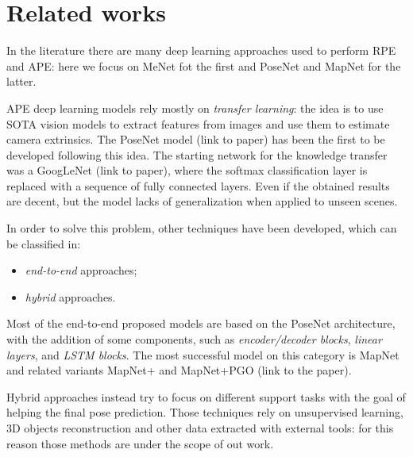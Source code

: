 \section{Related works}
In the literature there are many deep learning approaches used to perform RPE and APE: here we focus on MeNet fot the first and PoseNet and MapNet for the latter.

APE deep learning models rely mostly on \emph{transfer learning}: the idea is to use SOTA vision models to extract features from images and use them to estimate camera extrinsics.
The PoseNet model (link to paper) has been the first to be developed following this idea. The starting network for the knowledge transfer was a GoogLeNet (link to paper), where the softmax classification layer is replaced with a sequence of fully connected layers. Even if the obtained results are decent, but the model lacks of generalization when applied to unseen scenes.

In order to solve this problem, other techniques have been developed, which can be classified in:
\begin{itemize}
    \item \emph{end-to-end} approaches;
    \item \emph{hybrid} approaches.
\end{itemize}

Most of the end-to-end proposed models are based on the PoseNet architecture, with the addition of some components, such as \emph{encoder/decoder blocks}, \emph{linear layers}, and \emph{LSTM blocks}. The most successful model on this category is MapNet and related variants MapNet+ and MapNet+PGO (link to the paper).

Hybrid approaches instead try to focus on different support tasks with the goal of helping the final pose prediction. Those techniques rely on unsupervised learning, 3D objects reconstruction and other data extracted with external tools: for this reason those methods are under the scope of out work.
